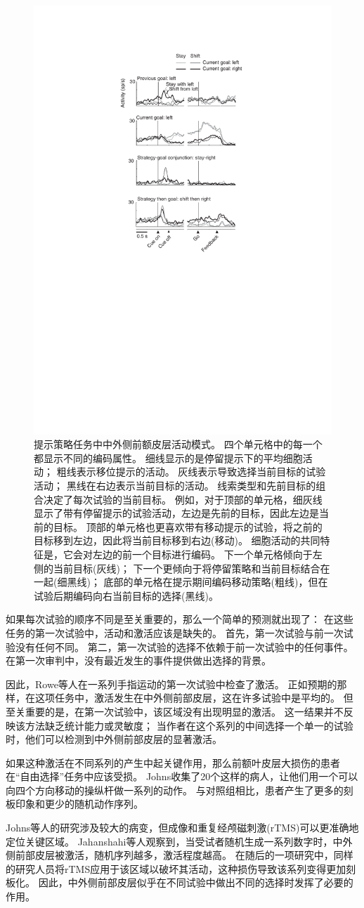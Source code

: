 \begin{figure}
	\centering
	\includegraphics[width=0.3\linewidth]{chap6/6_11}
	\caption{提示策略任务中中外侧前额皮层活动模式。
		四个单元格中的每一个都显示不同的编码属性。
		细线显示的是停留提示下的平均细胞活动；
		粗线表示移位提示的活动。
		灰线表示导致选择当前目标的试验活动；
		黑线在右边表示当前目标的活动。
		线索类型和先前目标的组合决定了每次试验的当前目标。
		例如，对于顶部的单元格，细灰线显示了带有停留提示的试验活动，左边是先前的目标，因此左边是当前的目标。
		顶部的单元格也更喜欢带有移动提示的试验，将之前的目标移到左边，因此将当前目标移到右边(移动)。
		细胞活动的共同特征是，它会对左边的前一个目标进行编码。
		下一个单元格倾向于左侧的当前目标(灰线)；
		下一个更倾向于将停留策略和当前目标结合在一起(细黑线)；
		底部的单元格在提示期间编码移动策略(粗线)，但在试验后期编码向右当前目标的选择(黑线)\cite{tsujimoto2011comparison}。}
	\label{fig:6_11}
\end{figure}


如果每次试验的顺序不同是至关重要的，那么一个简单的预测就出现了：
在这些任务的第一次试验中，活动和激活应该是缺失的。
首先，第一次试验与前一次试验没有任何不同。
第二，第一次试验的选择不依赖于前一次试验中的任何事件。
在第一次审判中，没有最近发生的事件提供做出选择的背景。


因此，Rowe等人\cite{rowe2010action}在一系列手指运动的第一次试验中检查了激活。
正如预期的那样，在这项任务中，激活发生在中外侧前部皮层，这在许多试验中是平均的。
但至关重要的是，在第一次试验中，该区域没有出现明显的激活。
这一结果并不反映该方法缺乏统计能力或灵敏度；
当作者在这个系列的中间选择一个单一的试验时，他们可以检测到中外侧前部皮层的显著激活。


如果这种激活在不同系列的产生中起关键作用，那么前额叶皮层大损伤的患者在“自由选择”任务中应该受损。
Johns\cite{johns1996effects}收集了20个这样的病人，让他们用一个可以向四个方向移动的操纵杆做一系列的动作。
与对照组相比，患者产生了更多的刻板印象和更少的随机动作序列。


Johns等人的研究涉及较大的病变，但成像和重复经颅磁刺激(rTMS)可以更准确地定位关键区域。
Jahanshahi等人\cite{jahanshahi2000role}观察到，当受试者随机生成一系列数字时，中外侧前部皮层被激活，随机序列越多，激活程度越高。
在随后的一项研究中\cite{jahanshahi1998left}，同样的研究人员将rTMS应用于该区域以破坏其活动，这种损伤导致该系列变得更加刻板化。
因此，中外侧前部皮层似乎在不同试验中做出不同的选择时发挥了必要的作用。



